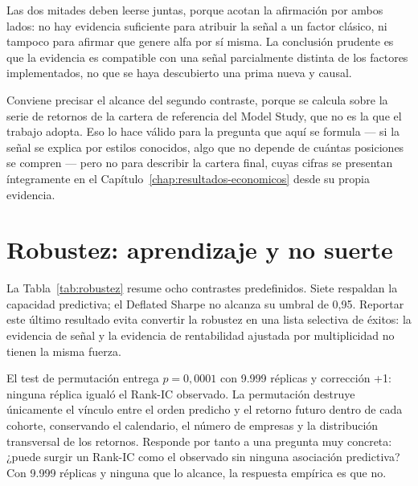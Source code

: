 Las dos mitades deben leerse juntas, porque acotan la afirmación por ambos lados: no hay evidencia
suficiente para atribuir la señal a un factor clásico, ni tampoco para afirmar que genere alfa por
sí misma. La conclusión prudente es que la evidencia es compatible con una señal parcialmente
distinta de los factores implementados, no que se haya descubierto una prima nueva y causal.

Conviene precisar el alcance del segundo contraste, porque se calcula sobre la serie de retornos de
la cartera de referencia del Model Study, que no es la que el trabajo adopta. Eso lo hace válido
para la pregunta que aquí se formula --- si la señal se explica por estilos conocidos, algo que no
depende de cuántas posiciones se compren --- pero no
para describir la cartera final, cuyas cifras se presentan íntegramente en el
Capítulo~\ref{chap:resultados-economicos} desde su propia evidencia.

\section{Robustez: aprendizaje y no suerte}
\label{sec:robustez}

La Tabla~\ref{tab:robustez} resume ocho contrastes predefinidos. Siete respaldan la capacidad
predictiva; el Deflated Sharpe no alcanza su umbral de 0,95. Reportar este último resultado evita
convertir la robustez en una lista selectiva de éxitos: la evidencia de señal y la evidencia de
rentabilidad ajustada por multiplicidad no tienen la misma fuerza.

\begin{table}[H]
  \centering
  \caption{Resumen de contrastes de robustez.}
  \label{tab:robustez}
  
  \caption*{Los contrastes de señal no dependen de la cartera; el Deflated Sharpe y las carteras
  aleatorias, que sí, están calculados sobre la cartera del Model Study.}
\end{table}


El test de permutación entrega $p=0,0001$ con 9.999 réplicas y corrección +1: ninguna réplica
igualó el Rank-IC observado. La permutación destruye únicamente el vínculo entre el orden predicho
y el retorno futuro dentro de cada cohorte, conservando el calendario, el número de empresas y la
distribución transversal de los retornos. Responde por tanto a una pregunta muy concreta: ¿puede
surgir un Rank-IC como el observado sin ninguna asociación predictiva? Con 9.999 réplicas y ninguna
que lo alcance, la respuesta empírica es que no.

